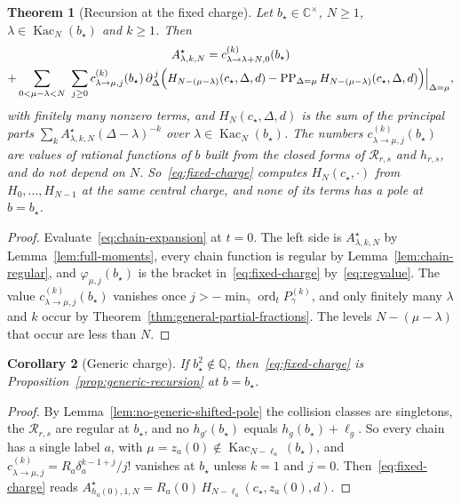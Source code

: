 \documentclass[twoside,10pt]{article}
\numberwithin{equation}{section}
\theoremstyle{slbody}
\newtheorem{theorem}{Theorem}[section]
\newtheorem{corollary}[theorem]{Corollary}
\theoremstyle{definition}
\theoremstyle{remark}
\newcommand{\PP}{\operatorname{PP}}
\begin{document}
\begin{theorem}[Recursion at the fixed charge]\label{thm:fixed-charge}
Let $b_\star\in\mathbb C^\times$, $N\geq1$,
$\lambda\in\operatorname{Kac}_N(b_\star)$ and $k\geq1$.  Then
\begin{multline}\label{eq:fixed-charge}
 A^\star_{\lambda,k,N}=c^{(k)}_{\lambda\to\lambda+N,0}(b_\star)\\
 +\sum_{0<\mu-\lambda<N}\ \sum_{j\geq0}c^{(k)}_{\lambda\to\mu,j}(b_\star)\,
 \partial_\Delta^{\,j}\Bigl(H_{N-(\mu-\lambda)}(c_\star,\Delta,d)
 -\PP_{\Delta=\mu}H_{N-(\mu-\lambda)}(c_\star,\Delta,d)\Bigr)\Big|_{\Delta=\mu},
\end{multline}
with finitely many nonzero terms, and $H_N(c_\star,\Delta,d)$ is the sum of
the principal parts $\sum_kA^\star_{\lambda,k,N}(\Delta-\lambda)^{-k}$ over
$\lambda\in\operatorname{Kac}_N(b_\star)$.  The numbers
$c^{(k)}_{\lambda\to\mu,j}(b_\star)$ are values of rational functions of $b$
built from the closed forms of ${\mathcal R}_{r,s}$ and $h_{r,s}$, and do not
depend on $N$.  So~\eqref{eq:fixed-charge} computes $H_N(c_\star,\cdot)$ from
$H_0,\dots,H_{N-1}$ at the same central charge, and none of its terms has a
pole at $b=b_\star$.
\end{theorem}

\begin{proof}
Evaluate~\eqref{eq:chain-expansion} at $t=0$.  The left side is
$A^\star_{\lambda,k,N}$ by Lemma~\ref{lem:full-moments}, every chain function
is regular by Lemma~\ref{lem:chain-regular}, and $\varphi_{\mu,j}(b_\star)$ is
the bracket in~\eqref{eq:fixed-charge} by~\eqref{eq:regvalue}.  The value
$c^{(k)}_{\lambda\to\mu,j}(b_\star)$ vanishes once
$j>-\min_\gamma\operatorname{ord}_tP^{(k)}_\gamma$, and only finitely many
$\lambda$ and $k$ occur by Theorem~\ref{thm:general-partial-fractions}.  The
levels $N-(\mu-\lambda)$ that occur are less than $N$.
\end{proof}

\begin{corollary}[Generic charge]\label{cor:fixed-charge-generic}
If $b_\star^2\notin\mathbb Q$, then~\eqref{eq:fixed-charge} is
Proposition~\ref{prop:generic-recursion} at $b=b_\star$.
\end{corollary}

\begin{proof}
By Lemma~\ref{lem:no-generic-shifted-pole} the collision classes are
singletons, the ${\mathcal R}_{r,s}$ are regular at $b_\star$, and no
$h_{g'}(b_\star)$ equals $h_g(b_\star)+\ell_g$.  So every chain has a single
label $a$, with $\mu=z_a(0)\notin\operatorname{Kac}_{N-\ell_a}(b_\star)$, and
$c^{(k)}_{\lambda\to\mu,j}=R_a\delta_a^{k-1+j}/j!$ vanishes at $b_\star$ unless
$k=1$ and $j=0$.  Then~\eqref{eq:fixed-charge} reads
$A^\star_{h_a(0),1,N}=R_a(0)\,H_{N-\ell_a}(c_\star,z_a(0),d)$.
\end{proof}
\end{document}
